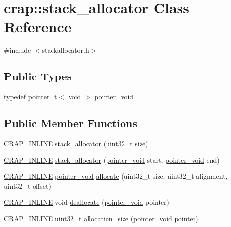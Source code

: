 \hypertarget{classcrap_1_1stack__allocator}{}\section{crap\+:\+:stack\+\_\+allocator Class Reference}
\label{classcrap_1_1stack__allocator}


{\ttfamily \#include $<$stackallocator.\+h$>$}

\subsection*{Public Types}
\begin{DoxyCompactItemize}
\item 
typedef \hyperlink{structcrap_1_1pointer__t}{pointer\+\_\+t}$<$ void $>$ \hyperlink{classcrap_1_1stack__allocator_a1595531e9229285629d99f036ebac325}{pointer\+\_\+void}
\end{DoxyCompactItemize}
\subsection*{Public Member Functions}
\begin{DoxyCompactItemize}
\item 
\hyperlink{config__x86_8h_a5a40526b8d842e7ff731509998bb0f1c}{C\+R\+A\+P\+\_\+\+I\+N\+L\+I\+N\+E} \hyperlink{classcrap_1_1stack__allocator_a91f7e72d7f669e0a25e53f14e2bf0e7e}{stack\+\_\+allocator} (uint32\+\_\+t size)
\item 
\hyperlink{config__x86_8h_a5a40526b8d842e7ff731509998bb0f1c}{C\+R\+A\+P\+\_\+\+I\+N\+L\+I\+N\+E} \hyperlink{classcrap_1_1stack__allocator_a9cafd8ae3316558ca6f1b68ed32bce47}{stack\+\_\+allocator} (\hyperlink{classcrap_1_1stack__allocator_a1595531e9229285629d99f036ebac325}{pointer\+\_\+void} start, \hyperlink{classcrap_1_1stack__allocator_a1595531e9229285629d99f036ebac325}{pointer\+\_\+void} end)
\item 
\hyperlink{config__x86_8h_a5a40526b8d842e7ff731509998bb0f1c}{C\+R\+A\+P\+\_\+\+I\+N\+L\+I\+N\+E} \hyperlink{classcrap_1_1stack__allocator_a1595531e9229285629d99f036ebac325}{pointer\+\_\+void} \hyperlink{classcrap_1_1stack__allocator_ab46f56492271335abc2a29c3f0ce05af}{allocate} (uint32\+\_\+t size, uint32\+\_\+t alignment, uint32\+\_\+t offset)
\item 
\hyperlink{config__x86_8h_a5a40526b8d842e7ff731509998bb0f1c}{C\+R\+A\+P\+\_\+\+I\+N\+L\+I\+N\+E} void \hyperlink{classcrap_1_1stack__allocator_a9489281da591e65d9a331c2ff2deaa11}{deallocate} (\hyperlink{classcrap_1_1stack__allocator_a1595531e9229285629d99f036ebac325}{pointer\+\_\+void} pointer)
\item 
\hyperlink{config__x86_8h_a5a40526b8d842e7ff731509998bb0f1c}{C\+R\+A\+P\+\_\+\+I\+N\+L\+I\+N\+E} uint32\+\_\+t \hyperlink{classcrap_1_1stack__allocator_adedeab58b056fc17740b11149083a290}{allocation\+\_\+size} (\hyperlink{classcrap_1_1stack__allocator_a1595531e9229285629d99f036ebac325}{pointer\+\_\+void} pointer)
\end{DoxyCompactItemize}



